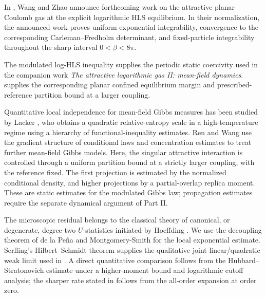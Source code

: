 \documentclass[11pt,reqno]{amsart}
\numberwithin{equation}{section}
\theoremstyle{plain}
\theoremstyle{definition}
\newcommand{\be}{\beta}
\begin{document}
In \cite[p.~9]{WangZhao2026}, Wang and Zhao announce forthcoming work \cite{WangZhaoAttractive2026} on the attractive planar Coulomb gas at the explicit logarithmic HLS equilibrium.  In their normalization, the announced work proves uniform exponential integrability, convergence to the corresponding Carleman--Fredholm determinant, and fixed-particle integrability throughout the sharp interval $0<\be<8\pi$.


The modulated log-HLS inequality supplies the periodic static coercivity used in the companion work \emph{The attractive logarithmic gas II: mean-field dynamics}.  supplies the corresponding planar confined equilibrium margin and prescribed-reference partition bound at a larger coupling.


Quantitative local independence for mean-field Gibbs measures has been studied by Lacker \cite{Lacker2022}, who obtains a quadratic relative-entropy scale in a high-temperature regime using a hierarchy of functional-inequality estimates. Ren and Wang \cite{RenWang2025} use the gradient structure of conditional laws and concentration estimates to treat further mean-field Gibbs models. Here, the singular attractive interaction is controlled through a uniform partition bound at a strictly larger coupling, with the reference fixed. The first projection is estimated by the normalized conditional density, and higher projections by a partial-overlap replica moment. These are static estimates for the modulated Gibbs law; propagation estimates require the separate dynamical argument of Part II.

The microscopic residual belongs to the classical theory of canonical, or degenerate, degree-two $U$-statistics initiated by Hoeffding \cite{Hoeffding1948}.  We use the decoupling theorem of de la Pe\~na and Montgomery-Smith \cite[Theorem~1]{delaPenaMontgomerySmith1995} for the local exponential estimate.  Serfling's Hilbert--Schmidt theorem \cite[Section~5.5.2]{Serfling1980} supplies the qualitative joint linear/quadratic weak limit used in .  A direct quantitative comparison follows from the Hubbard--Stratonovich estimate under a higher-moment bound and logarithmic cutoff analysis; the sharper rate stated in  follows from the all-order expansion at order zero.
\end{document}
